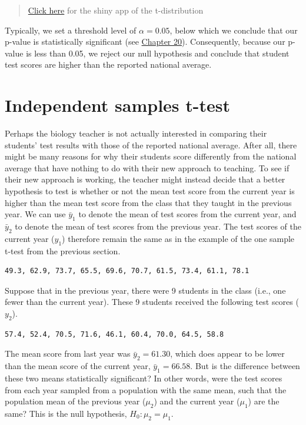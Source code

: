 \documentclass[
]{scrbook}
\begin{document}
\begin{quote}
\href{https://bradduthie.shinyapps.io/t_score/}{Click here} for the shiny app of the t-distribution
\end{quote}

Typically, we set a threshold level of \(\alpha = 0.05\), below which we conclude that our p-value is statistically significant (see \protect\hyperlink{Chapter_20}{Chapter 20}).
Consequently, because our p-value is less than 0.05, we reject our null hypothesis and conclude that student test scores are higher than the reported national average.

\hypertarget{independent-samples-t-test}{%
\section{Independent samples t-test}\label{independent-samples-t-test}}

Perhaps the biology teacher is not actually interested in comparing their students' test results with those of the reported national average.
After all, there might be many reasons for why their students score differently from the national average that have nothing to do with their new approach to teaching.
To see if their new approach is working, the teacher might instead decide that a better hypothesis to test is whether or not the mean test score from the current year is higher than the mean test score from the class that they taught in the previous year.
We can use \(\bar{y}_{1}\) to denote the mean of test scores from the current year, and \(\bar{y}_{2}\) to denote the mean of test scores from the previous year.
The test scores of the current year (\(y_{1}\)) therefore remain the same as in the example of the one sample t-test from the previous section.

\begin{verbatim}
49.3, 62.9, 73.7, 65.5, 69.6, 70.7, 61.5, 73.4, 61.1, 78.1
\end{verbatim}

Suppose that in the previous year, there were 9 students in the class (i.e., one fewer than the current year).
These 9 students received the following test scores (\(y_{2}\)).

\begin{verbatim}
57.4, 52.4, 70.5, 71.6, 46.1, 60.4, 70.0, 64.5, 58.8
\end{verbatim}

The mean score from last year was \(\bar{y}_{2} = 61.30\), which does appear to be lower than the mean score of the current year, \(\bar{y}_{1} = 66.58\).
But is the difference between these two means statistically significant?
In other words, were the test scores from each year sampled from a population with the same mean, such that the population mean of the previous year (\(\mu_{2}\)) and the current year (\(\mu_{1}\)) are the same?
This is the null hypothesis, \(H_{0}: \mu_{2} = \mu_{1}\).
\end{document}
